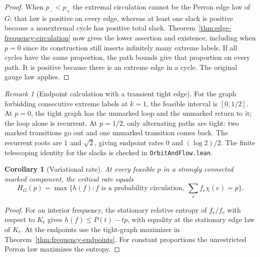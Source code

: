 \documentclass[11pt]{article}
\newtheorem{corollary}[theorem]{Corollary}
\theoremstyle{definition}
\theoremstyle{remark}
\newtheorem{remark}[theorem]{Remark}
\begin{document}
\begin{proof}
When $p_-<p_+$ the extremal circulation cannot be the
Perron edge law of $G$: that law is positive on every edge,
whereas at least one slack is positive because a nonextremal
cycle has positive total slack. Theorem~\ref{thm:edge-frequency-circulation}
now gives the lower assertion and existence, including when
$p=0$ since its construction still inserts infinitely many
extreme labels. If all cycles have the same proportion, the
path bounds give that proportion on every path. It is positive
because there is an extreme edge in a cycle. The original
gauge law applies.
\end{proof}

\begin{remark}[Endpoint calculation with a transient tight edge]
For the graph forbidding consecutive extreme labels at $k=1$,
the feasible interval is $[0,1/2]$. At $p=0$, the tight graph has
the unmarked loop and the unmarked return to it; the loop alone
is recurrent. At $p=1/2$, only alternating paths are tight:
two marked transitions go out and one unmarked transition comes
back. The recurrent roots are $1$ and $\sqrt2$, giving endpoint
rates $0$ and $(\log 2)/2$. The finite telescoping identity for the
slacks is checked in \texttt{OrbitAndFlow.lean}.
\end{remark}

\begin{corollary}[Variational rate]\label{cor:variational-frequency-rate}
At every feasible $p$ in a strongly connected marked component, the
critical rate equals
\[
 H_G(p)=\max\{h(f): f\text{ is a probability circulation},\
                      \sum_e f_e\chi(e)=p\}.
\]
\end{corollary}
\begin{proof}
For an interior frequency, the stationary relative entropy of
$f_e/f_v$ with respect to $K_t$ gives
$h(f)\le P(t)-tp$, with equality at the stationary edge law of
$K_t$. At the endpoints use the tight-graph maximizer in
Theorem~\ref{thm:frequency-endpoints}. For constant proportions
the unrestricted Perron law maximizes the entropy.
\end{proof}
\end{document}
